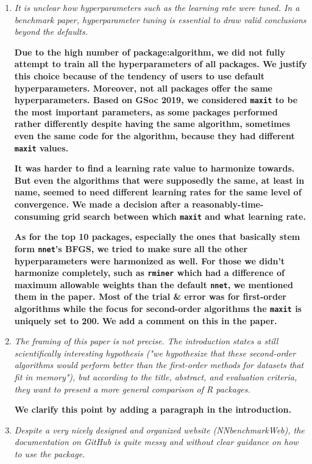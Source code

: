 \documentclass[12pt]{article}
\newcommand{\code}{\texttt}
\begin{document}
\begin{enumerate}
\item \textit{It is unclear how hyperparameters such as the learning rate were tuned. In a benchmark paper, hyperparameter tuning is essential to draw valid conclusions beyond the defaults.}

\textbf{Due to the high number of package:algorithm, we did not fully attempt to train all the hyperparameters of all packages. 
We justify this choice because of the tendency of users to use default hyperparameters. Moreover, not all packages offer the same hyperparameters. 
Based on GSoc 2019, we considered \code{maxit} to be the most important parameters, as some packages performed rather differently despite 
having the same algorithm, sometimes even the same code for the algorithm, because they had different \code{maxit} values. }

\textbf{It was harder to find a learning rate value to harmonize towards. 
But even the algorithms that were supposedly the same, at least in name, seemed to need different learning rates for the same level of convergence. 
We made a decision after a reasonably-time-consuming grid search between which \code{maxit} and what learning rate. }

\textbf{As for the top 10 packages, especially the ones that basically stem form \code{nnet}'s BFGS, we tried to make sure all the other hyperparameters 
were harmonized as well. 
For those we didn't harmonize completely, such as \code{rminer} which had a difference of maximum allowable weights than the default \code{nnet}, 
we mentioned them in the paper. 
Most of the trial \& error was for first-order algorithms while the focus for second-order algorithms the \code{maxit} is uniquely set to 200. }
\textbf{We add a comment on this in the paper.}


\item \textit{The framing of this paper is not precise. The introduction states a still scientifically interesting hypothesis ("we hypothesize that these second-order algorithms would perform better than the first-order methods for datasets that fit in memory"), but according to the title, abstract, and evaluation criteria, they want to present a more general comparison of R packages.}

\textbf{We clarify this point by adding a paragraph in the introduction.}



\item \textit{Despite a very nicely designed and organized website (NNbenchmarkWeb), the documentation on GitHub is quite messy and without clear guidance on how to use the package.}


\end{enumerate}
\end{document}
